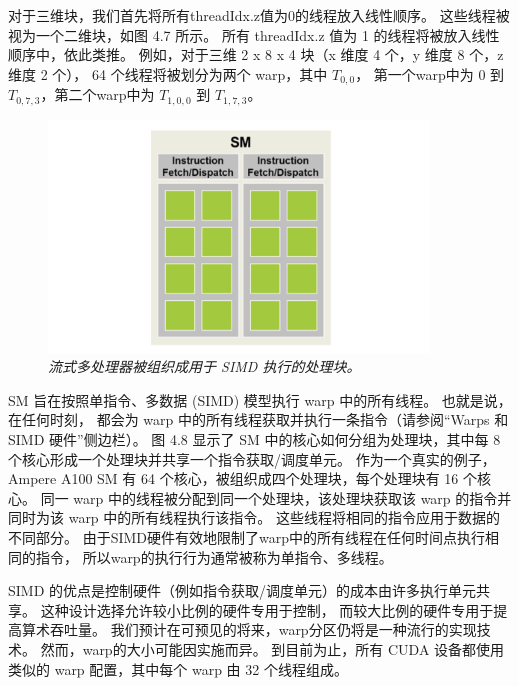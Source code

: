 对于三维块，我们首先将所有threadIdx.z值为0的线程放入线性顺序。 这些线程被视为一个二维块，如图 4.7 所示。 
所有 threadIdx.z 值为 1 的线程将被放入线性顺序中，依此类推。 
例如，对于三维 2 x 8 x 4 块（x 维度 4 个，y 维度 8 个，z 维度 2 个），
64 个线程将被划分为两个 warp，其中 $T_{0,0}$， 
第一个warp中为 0 到 $T_{0,7,3}$，第二个warp中为 $T_{1,0,0}$ 到 $T_{1,7,3}$。

\begin{figure}[H]
	\centering
	\includegraphics[width=0.9\textwidth]{figs/F4.8.png}
	\caption{\textit{流式多处理器被组织成用于 SIMD 执行的处理块。}}
\end{figure}

SM 旨在按照单指令、多数据 (SIMD) 模型执行 warp 中的所有线程。 也就是说，在任何时刻，
都会为 warp 中的所有线程获取并执行一条指令（请参阅“Warps 和 SIMD 硬件”侧边栏）。 
图 4.8 显示了 SM 中的核心如何分组为处理块，其中每 8 个核心形成一个处理块并共享一个指令获取/调度单元。 
作为一个真实的例子，Ampere A100 SM 有 64 个核心，被组织成四个处理块，每个处理块有 16 个核心。 
同一 warp 中的线程被分配到同一个处理块，该处理块获取该 warp 的指令并同时为该 warp 中的所有线程执行该指令。 
这些线程将相同的指令应用于数据的不同部分。 由于SIMD硬件有效地限制了warp中的所有线程在任何时间点执行相同的指令，
所以warp的执行行为通常被称为单指令、多线程。

SIMD 的优点是控制硬件（例如指令获取/调度单元）的成本由许多执行单元共享。 这种设计选择允许较小比例的硬件专用于控制，
而较大比例的硬件专用于提高算术吞吐量。 我们预计在可预见的将来，warp分区仍将是一种流行的实现技术。 
然而，warp的大小可能因实施而异。 到目前为止，所有 CUDA 设备都使用类似的 warp 配置，其中每个 warp 由 32 个线程组成。

